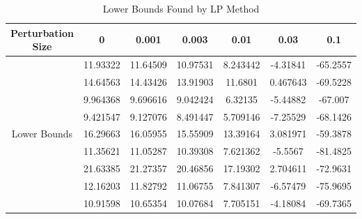 \documentclass[12pt]{article}
\begin{document}
\begin{enumerate}[1.]
\begin{table}[H]
	\centering
	\caption{Lower Bounds Found by LP Method}
	\begin{tabular}{ccccccc}
		\toprule
		Perturbation Size & 0    & 0.001 & 0.003 & 0.01 & 0.03 & 0.1 \\
		\midrule
		\multirow{9}[2]{*}{Lower Bounds} & 11.93322 & 11.64509 & 10.97531 & 8.243442 & -4.31841 & -65.2557 \\
		& 14.64563 & 14.43426 & 13.91903 & 11.6801 & 0.467643 & -69.5228 \\
		& 9.964368 & 9.696616 & 9.042424 & 6.32135 & -5.44882 & -67.007 \\
		& 9.421547 & 9.127076 & 8.491447 & 5.709146 & -7.25529 & -68.1426 \\
		& 16.29663 & 16.05955 & 15.55909 & 13.39164 & 3.081971 & -59.3878 \\
		& 11.35621 & 11.05287 & 10.39308 & 7.621362 & -5.5567 & -81.4825 \\
		& 21.63385 & 21.27357 & 20.46856 & 17.19302 & 2.704611 & -72.9631 \\
		& 12.16203 & 11.82792 & 11.06755 & 7.841307 & -6.57479 & -75.9695 \\
		& 10.91598 & 10.65354 & 10.07684 & 7.705151 & -4.18084 & -69.7365 \\
		\bottomrule
	\end{tabular}
	\label{tab:lp}
\end{table}
\end{enumerate}
\end{document}
